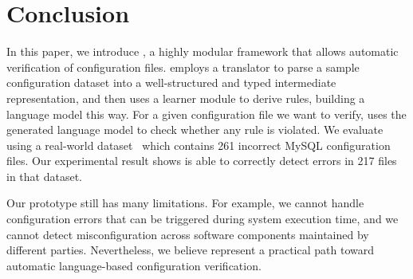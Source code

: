 
\section{Conclusion}

In this paper, we introduce \app, a highly modular framework 
that allows automatic verification of configuration files.
\app employs a translator to parse a sample configuration dataset
into a well-structured and typed intermediate representation,
and then uses a learner module to derive rules, 
building a language model this way.
For a given configuration file we want to verify,
\app uses the generated language model to check
whether any rule is violated.
We evaluate \app using a real-world dataset~\cite{configdataset}
which contains 261 incorrect MySQL configuration files.
Our experimental result shows \app is able to
correctly detect errors in 217 files in that dataset.

Our \app prototype still has many limitations. 
For example, we cannot handle configuration errors that can be 
triggered during system execution time, 
and we cannot detect misconfiguration across software components
maintained by different parties. 
Nevertheless, we believe \app represent a practical path
toward automatic language-based configuration verification.

